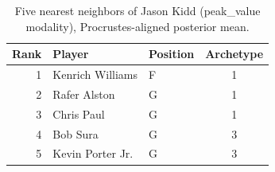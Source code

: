 \begin{table}[htbp]
  \centering\small
  \begin{tabular}{rllc}
    \toprule
    Rank & Player & Position & Archetype \\
    \midrule
    1 & Kenrich Williams & F & 1 \\
    2 & Rafer Alston & G & 1 \\
    3 & Chris Paul & G & 1 \\
    4 & Bob Sura & G & 3 \\
    5 & Kevin Porter Jr. & G & 3 \\
    \bottomrule
  \end{tabular}
  \caption{Five nearest neighbors of Jason Kidd (peak_value modality), Procrustes-aligned posterior mean.}
  \label{tab:Jason_Kidd_neighbors_peak_value}
\end{table}

